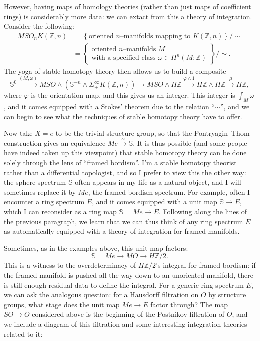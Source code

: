 \documentclass{article}
\newcommand{\Z}{\mathbb Z}
\renewcommand{\S}{\mathbb S}
\newcommand{\<}{\langle}
\renewcommand{\>}{\rangle}
\newcommand{\sm}{\wedge}
\newcommand{\Susp}{\Sigma}
\renewcommand{\phi}{\varphi}
\newcommand{\Spin}{\mathit{Spin}}
\numberwithin{equation}{section}
\theoremstyle{plain}
\theoremstyle{definition}
\theoremstyle{remark}
\begin{document}
However, having maps of homology theories (rather than just maps of coefficient rings) is considerably more data: we can extact from this a theory of integration.  Consider the following:
\begin{align*}
MSO_n K(\Z, n) & = \left\{ \text{oriented $n$--manifolds mapping to $K(\Z, n)$} \right\} / \sim \\
& = \left\{ \begin{array}{c}\text{oriented $n$--manifolds $M$} \\ \text{with a specified class $\omega \in H^n(M; \Z)$} \end{array}\right\} / \sim.
\end{align*}
The yoga of stable homotopy theory then allows us to build a composite \[\S^0 \xrightarrow{(M, \omega)} MSO \sm (\S^{-n} \sm \Susp^\infty_+ K(\Z, n)) \to MSO \sm H\Z \xrightarrow{\phi \sm 1} H\Z \sm H\Z \xrightarrow\mu H\Z,\] where $\phi$ is the orientation map, and this gives us an integer. This integer is $\int_M \omega$, and it comes equipped with a Stokes' theorem due to the relation ``$\sim$'', and we can begin to see what the techniques of stable homotopy theory have to offer.

Now take $X = e$ to be the trivial structure group, so that the Pontryagin--Thom construction gives an equivalence $Me \xrightarrow{\simeq} \S$.  It is thus possible (and some people have indeed taken up this viewpoint) that stable homotopy theory can be done solely through the lens of ``framed bordism''. I'm a stable homotopy theorist rather than a differential topologist, and so I prefer to view this the other way: the sphere spectrum $\S$ often appears in my life as a natural object, and I will sometimes replace it by $Me$, the framed bordism spectrum.  For example, often I encounter a ring spectrum $E$, and it comes equipped with a unit map $\S \to E$, which I can reconsider as a ring map $\S = Me \to E$.  Following along the lines of the previous paragraph, we learn that we can thus think of any ring spectrum $E$ as automatically equipped with a theory of integration for framed manifolds.

Sometimes, as in the examples above, this unit map factors: \[\S = Me \to MO \to H\Z/2.\]  This is a witness to the overdeterminacy of $H\Z/2$'s integral for framed bordism: if the framed manifold is pushed all the way down to an unoriented manifold, there is still enough residual data to define the integral.  For a generic ring spectrum $E$, we can ask the analogous question: for a Hausdorff filtration on $O$ by structure groups, what stage does the unit map $Me \to E$ factor through?  The map $SO \to O$ considered above is the beginning of the Postnikov filtration of $O$, and we include a diagram of this filtration and some interesting integration theories related to it:
\begin{center}
\end{center}
\end{document}
